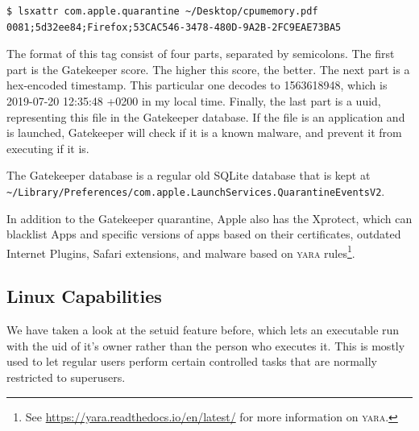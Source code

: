 \documentclass[a4paper]{article}
\begin{document}
\begin{verbatim}
$ lsxattr com.apple.quarantine ~/Desktop/cpumemory.pdf
0081;5d32ee84;Firefox;53CAC546-3478-480D-9A2B-2FC9EAE73BA5
\end{verbatim}
The format of this tag consist of four parts, separated by semicolons. The first part is the Gatekeeper score. The higher this score, the better. The next part is a hex-encoded timestamp. This particular one decodes to 1563618948, which is 2019-07-20 12:35:48 +0200 in my local time. Finally, the last part is a \gls{uuid}, representing this file in the Gatekeeper database. If the file is an application and is launched, Gatekeeper will check if it is a known malware, and prevent it from executing if it is.

The Gatekeeper database is a regular old SQLite database that is kept at \texttt{\textasciitilde/Library/Preferences/com.apple.LaunchServices.QuarantineEventsV2}.


In addition to the Gatekeeper quarantine, Apple also has the Xprotect, which can blacklist Apps and specific versions of apps based on their certificates, outdated Internet Plugins, Safari extensions, and malware based on \textsc{yara} rules\footnote{See \url{https://yara.readthedocs.io/en/latest/} for more information on \textsc{yara}.}.

\subsection{Linux Capabilities}

We have taken a look at the setuid feature before, which lets an executable run with the \gls{uid} of it's owner rather than the person who executes it. This is mostly used to let regular users perform certain controlled tasks that are normally restricted to superusers.
\end{document}
